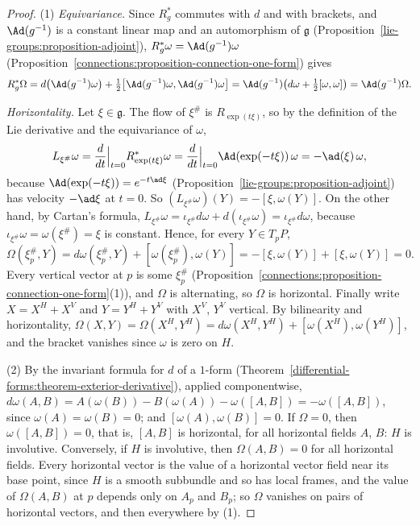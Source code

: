 \begin{proof}
(1) \emph{Equivariance.} Since $R_g^*$ commutes with $d$ and with brackets, and $\Ad(g^{-1})$ is a constant linear map and an automorphism of $\mathfrak{g}$
(Proposition~\ref{lie-groups:proposition-adjoint}), $R_g^*\omega = \Ad(g^{-1})\omega$ (Proposition~\ref{connections:proposition-connection-one-form}) gives
\[
R_g^*\Omega = d\bigl(\Ad(g^{-1})\omega\bigr) + \tfrac12\bigl[\Ad(g^{-1})\omega, \Ad(g^{-1})\omega\bigr] = \Ad(g^{-1})\bigl(d\omega + \tfrac12[\omega, \omega]\bigr) = \Ad(g^{-1})\Omega .
\]

\emph{Horizontality.} Let $\xi \in \mathfrak{g}$. The flow of $\xi^\#$ is $R_{\exp(t\xi)}$, so by the definition of the Lie derivative and the equivariance of $\omega$,
\[
L_{\xi^\#}\omega = \frac{d}{dt}\Big|_{t=0}R_{\exp(t\xi)}^*\omega = \frac{d}{dt}\Big|_{t=0}\Ad(\exp(-t\xi))\,\omega = -\ad(\xi)\,\omega,
\]
because $\Ad(\exp(-t\xi)) = e^{-t\ad\xi}$ (Proposition~\ref{lie-groups:proposition-adjoint}) has velocity $-\ad\xi$ at $t = 0$. So $(L_{\xi^\#}\omega)(Y) = -[\xi, \omega(Y)]$. On the other hand, by Cartan's formula,
$L_{\xi^\#}\omega = \iota_{\xi^\#}d\omega + d(\iota_{\xi^\#}\omega) = \iota_{\xi^\#}d\omega$, because $\iota_{\xi^\#}\omega = \omega(\xi^\#) = \xi$ is constant. Hence, for every $Y \in T_pP$,
\[
\Omega(\xi^\#_p, Y) = d\omega(\xi^\#_p, Y) + [\omega(\xi^\#_p), \omega(Y)] = -[\xi, \omega(Y)] + [\xi, \omega(Y)] = 0 .
\]
Every vertical vector at $p$ is some $\xi^\#_p$ (Proposition~\ref{connections:proposition-connection-one-form}(1)), and $\Omega$ is alternating, so $\Omega$ is horizontal. Finally write
$X = X^H + X^V$ and $Y = Y^H + Y^V$ with $X^V$, $Y^V$ vertical. By bilinearity and horizontality, $\Omega(X, Y) = \Omega(X^H, Y^H) = d\omega(X^H, Y^H) + [\omega(X^H), \omega(Y^H)]$, and the bracket
vanishes since $\omega$ is zero on $H$.

(2) By the invariant formula for $d$ of a $1$-form (Theorem~\ref{differential-forms:theorem-exterior-derivative}), applied componentwise,
$d\omega(A, B) = A(\omega(B)) - B(\omega(A)) - \omega([A, B]) = -\omega([A, B])$, since $\omega(A) = \omega(B) = 0$; and $[\omega(A), \omega(B)] = 0$. If $\Omega = 0$, then $\omega([A, B]) = 0$, that is, $[A, B]$ is horizontal,
for all horizontal fields $A$, $B$: $H$ is involutive. Conversely, if $H$ is involutive, then $\Omega(A, B) = 0$ for all horizontal fields. Every horizontal vector is the value of a horizontal vector field near its base
point, since $H$ is a smooth subbundle and so has local frames, and the value of $\Omega(A, B)$ at $p$ depends only on $A_p$ and $B_p$; so $\Omega$ vanishes on pairs of horizontal vectors, and then everywhere by (1).


\end{proof}
